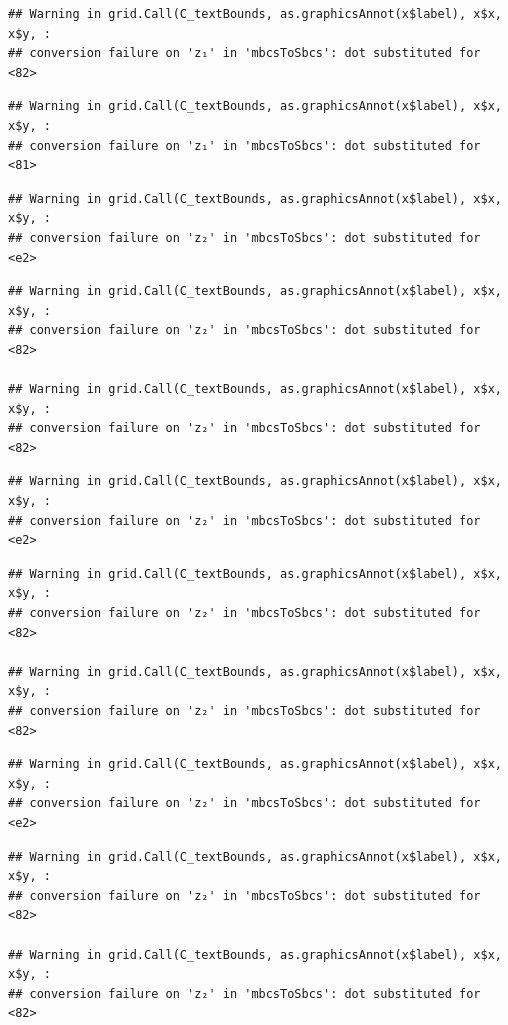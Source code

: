 \documentclass[]{article}
\begin{document}
\begin{verbatim}
## Warning in grid.Call(C_textBounds, as.graphicsAnnot(x$label), x$x, x$y, :
## conversion failure on 'z₁' in 'mbcsToSbcs': dot substituted for <82>
\end{verbatim}

\begin{verbatim}
## Warning in grid.Call(C_textBounds, as.graphicsAnnot(x$label), x$x, x$y, :
## conversion failure on 'z₁' in 'mbcsToSbcs': dot substituted for <81>
\end{verbatim}

\begin{verbatim}
## Warning in grid.Call(C_textBounds, as.graphicsAnnot(x$label), x$x, x$y, :
## conversion failure on 'z₂' in 'mbcsToSbcs': dot substituted for <e2>
\end{verbatim}

\begin{verbatim}
## Warning in grid.Call(C_textBounds, as.graphicsAnnot(x$label), x$x, x$y, :
## conversion failure on 'z₂' in 'mbcsToSbcs': dot substituted for <82>

## Warning in grid.Call(C_textBounds, as.graphicsAnnot(x$label), x$x, x$y, :
## conversion failure on 'z₂' in 'mbcsToSbcs': dot substituted for <82>
\end{verbatim}

\begin{verbatim}
## Warning in grid.Call(C_textBounds, as.graphicsAnnot(x$label), x$x, x$y, :
## conversion failure on 'z₂' in 'mbcsToSbcs': dot substituted for <e2>
\end{verbatim}

\begin{verbatim}
## Warning in grid.Call(C_textBounds, as.graphicsAnnot(x$label), x$x, x$y, :
## conversion failure on 'z₂' in 'mbcsToSbcs': dot substituted for <82>

## Warning in grid.Call(C_textBounds, as.graphicsAnnot(x$label), x$x, x$y, :
## conversion failure on 'z₂' in 'mbcsToSbcs': dot substituted for <82>
\end{verbatim}

\begin{verbatim}
## Warning in grid.Call(C_textBounds, as.graphicsAnnot(x$label), x$x, x$y, :
## conversion failure on 'z₂' in 'mbcsToSbcs': dot substituted for <e2>
\end{verbatim}

\begin{verbatim}
## Warning in grid.Call(C_textBounds, as.graphicsAnnot(x$label), x$x, x$y, :
## conversion failure on 'z₂' in 'mbcsToSbcs': dot substituted for <82>

## Warning in grid.Call(C_textBounds, as.graphicsAnnot(x$label), x$x, x$y, :
## conversion failure on 'z₂' in 'mbcsToSbcs': dot substituted for <82>
\end{verbatim}
\end{document}
